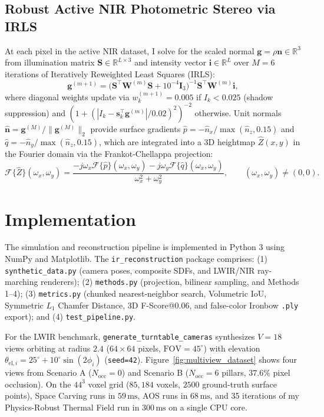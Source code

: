 \documentclass[12pt,letterpaper]{article}
\begin{document}
\subsection{Robust Active NIR Photometric Stereo via IRLS}
At each pixel in the active NIR dataset, I solve for the scaled normal $\mathbf{g} = \rho\mathbf{n} \in \mathbb{R}^3$ from illumination matrix $\mathbf{S} \in \mathbb{R}^{L \times 3}$ and intensity vector $\mathbf{i} \in \mathbb{R}^L$ over $M = 6$ iterations of Iteratively Reweighted Least Squares (IRLS):
\begin{equation}
  \mathbf{g}^{(m+1)} = \big(\mathbf{S}^\top \mathbf{W}^{(m)} \mathbf{S} + 10^{-4}\mathbf{I}_3\big)^{-1} \mathbf{S}^\top \mathbf{W}^{(m)} \mathbf{i},
  \label{eq:irls_solve}
\end{equation}
where diagonal weights update via $w_k^{(m+1)} = 0.005$ if $I_k < 0.025$ (shadow suppression) and $(1 + (|I_k - \mathbf{s}_k^\top \mathbf{g}^{(m)}| / 0.02)^2)^{-2}$ otherwise. Unit normals $\hat{\mathbf{n}} = \mathbf{g}^{(M)} / \|\mathbf{g}^{(M)}\|_2$ provide surface gradients $\hat{p} = -\hat{n}_x/\max(\hat{n}_z, 0.15)$ and $\hat{q} = -\hat{n}_y/\max(\hat{n}_z, 0.15)$, which are integrated into a 3D heightmap $\hat{Z}(x,y)$ in the Fourier domain via the Frankot-Chellappa projection:
\begin{equation}
  \mathcal{F}\{\hat{Z}\}(\omega_x, \omega_y) = \frac{-j\omega_x \mathcal{F}\{\hat{p}\}(\omega_x, \omega_y) - j\omega_y \mathcal{F}\{\hat{q}\}(\omega_x, \omega_y)}{\omega_x^2 + \omega_y^2}, \qquad (\omega_x, \omega_y) \neq (0, 0).
  \label{eq:frankot_chellappa}
\end{equation}

\section{Implementation}
\label{sec:implementation}

The simulation and reconstruction pipeline is implemented in Python 3 using NumPy and Matplotlib. The \texttt{ir\_reconstruction} package comprises: (1) \texttt{synthetic\_data.py} (camera poses, composite SDFs, and LWIR/NIR ray-marching renderers); (2) \texttt{methods.py} (projection, bilinear sampling, and Methods 1--4); (3) \texttt{metrics.py} (chunked nearest-neighbor search, Volumetric IoU, Symmetric $L_1$ Chamfer Distance, 3D F-Score@0.06, and false-color Ironbow \texttt{.ply} export); and (4) \texttt{test\_pipeline.py}.

For the LWIR benchmark, \texttt{generate\_turntable\_cameras} synthesizes $V = 18$ views orbiting at radius $2.4$ ($64 \times 64$ pixels, $\text{FOV} = 45^\circ$) with elevation $\theta_{\text{el}, i} = 25^\circ + 10^\circ \sin(2\phi_i)$ (\texttt{seed=42}). Figure~\ref{fig:multiview_dataset} shows four views from Scenario A ($N_{\text{occ}} = 0$) and Scenario B ($N_{\text{occ}} = 6$ pillars, $37.6\%$ pixel occlusion). On the $44^3$ voxel grid ($85{,}184$ voxels, $2500$ ground-truth surface points), Space Carving runs in $59\,\text{ms}$, AOS runs in $68\,\text{ms}$, and 35 iterations of my Physics-Robust Thermal Field run in $300\,\text{ms}$ on a single CPU core.
\end{document}
